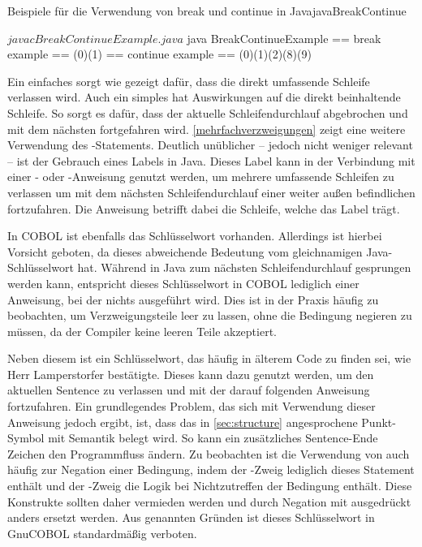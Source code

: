 \begin{codeWithCaption}{Beispiele für die Verwendung von break und continue in Java}{javaBreakContinue}
\begin{shellwindow}
$ javac BreakContinueExample.java 
$ java BreakContinueExample
== break example == 
(0)(1)
== continue example == 
(0)(1)(2)(8)(9)
\end{shellwindow}
\end{codeWithCaption}

Ein einfaches  sorgt wie gezeigt dafür, dass die direkt umfassende Schleife verlassen wird. Auch ein simples  hat Auswirkungen auf die direkt beinhaltende Schleife. So sorgt es dafür, dass der aktuelle Schleifendurchlauf abgebrochen und mit dem nächsten fortgefahren wird. \autoref{mehrfachverzweigungen} zeigt eine weitere Verwendung des -Statements. Deutlich unüblicher -- jedoch nicht weniger relevant -- ist der Gebrauch eines Labels in Java. Dieses Label kann in der Verbindung mit einer - oder -Anweisung genutzt werden, um mehrere umfassende Schleifen zu verlassen \bzw um mit dem nächsten Schleifendurchlauf einer weiter außen befindlichen fortzufahren. Die Anweisung betrifft dabei die Schleife, welche das Label trägt. 

In COBOL ist ebenfalls das Schlüsselwort  vorhanden. Allerdings ist hierbei Vorsicht geboten, da dieses abweichende Bedeutung vom gleichnamigen Java-Schlüsselwort hat. Während in Java zum nächsten Schleifendurchlauf gesprungen werden kann, entspricht dieses Schlüsselwort in COBOL lediglich einer Anweisung, bei der nichts ausgeführt wird. Dies ist in der Praxis häufig zu beobachten, um \zB Verzweigungsteile leer zu lassen, ohne die Bedingung negieren zu müssen, da der Compiler keine leeren Teile akzeptiert.

Neben diesem ist  ein Schlüsselwort, das häufig in älterem Code zu finden sei, wie Herr Lamperstorfer bestätigte. Dieses kann dazu genutzt werden, um den aktuellen Sentence zu verlassen und mit der darauf folgenden Anweisung fortzufahren. Ein grundlegendes Problem, das sich mit Verwendung dieser Anweisung jedoch ergibt, ist, dass das in \autoref{sec:structure} angesprochene Punkt-Symbol mit Semantik belegt wird. So kann ein zusätzliches Sentence-Ende Zeichen den Programmfluss ändern. Zu beobachten ist die Verwendung von  auch häufig zur Negation einer Bedingung, indem der -Zweig lediglich dieses Statement enthält und der -Zweig die Logik bei Nichtzutreffen der Bedingung enthält. Diese Konstrukte sollten daher vermieden werden und durch Negation mit  ausgedrückt \bzw anders ersetzt werden. Aus genannten Gründen ist dieses Schlüsselwort in GnuCOBOL standardmäßig verboten.

